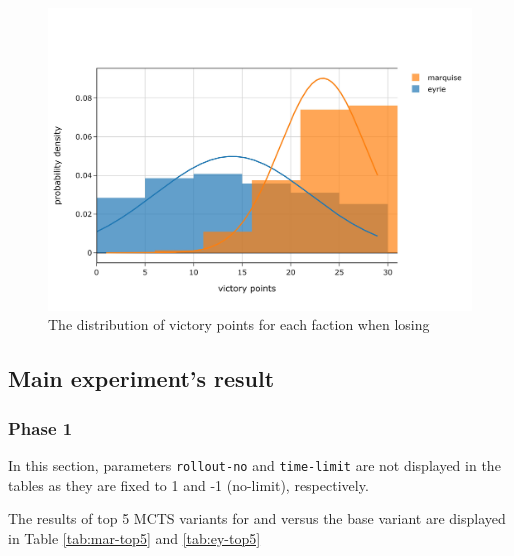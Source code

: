 \begin{figure}[h!]
    \begin{center}
      \includegraphics[width=\textwidth]{./images/fig-introductory-loser-vp-dist.jpeg}
    \end{center}
    \caption{The distribution of victory points for each faction when losing}
    \label{fig:introductory-loser-vp-dist}
\end{figure}

\subsection{Main experiment's result}

\subsubsection{Phase 1}


In this section, parameters \texttt{rollout-no} and \texttt{time-limit} are not displayed in the tables as they are fixed to 1 and -1 (no-limit), respectively.

The results of top 5 MCTS variants for \Marquise{} and \Eyrie{} versus the base variant are displayed in Table \ref{tab:mar-top5} and \ref{tab:ey-top5}

